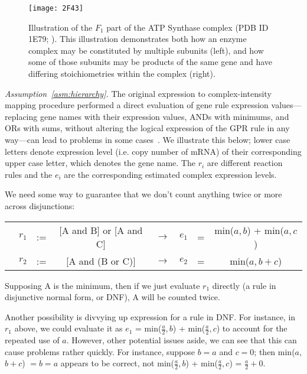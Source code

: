 \begin{figure*}%
\label{fig:2F43}
\centering
\texttt{[image: 2F43]}
\caption{Illustration of the $F_1$ part of the ATP Synthase complex
  (PDB ID 1E79; \citealt{Gibbons2000,Bernstein1978,Gezelter}).
  This illustration demonstrates both how an enzyme complex may be
  constituted by multiple subunits (left), and how some of those
  subunits may be products of the same gene and have differing
  stoichiometries within the complex (right).}
\end{figure*}

\emph{Assumption~\ref{asm:hierarchy}.}
The original expression to complex-intensity mapping procedure
performed a direct evaluation of gene rule expression
values---replacing gene names with their expression values, ANDs with
minimums, and ORs with sums, without altering the logical expression
of the GPR rule in any way---can lead to problems in some
cases~\citep{Lee2012}. We illustrate this below; lower case letters
denote expression level (i.e. copy number of mRNA) of their
corresponding upper case letter, which denotes the gene name. The
$r_i$ are different reaction rules and the $e_i$ are the corresponding
estimated complex expression levels.

We need some way to guarantee that we don’t count anything twice or
more across disjunctions: 
\begin{AlgFloat}[H]
{\setlength{\tabcolsep}{.16667em}
\begin{tabular}{cccccccc}
& $r_1$ & := & [A and B] or [A and C] & $\rightarrow$ & $e_1$  &=& min($a,b$) + min($a,c$) \\ 
& $r_2$ & := & [A and (B or C)]       & $\rightarrow$ & $e_2$  &=&  min($a, b + c$) 
\end{tabular} 
}
\end{AlgFloat}

Supposing A is the minimum, then if we just evaluate $r_1$ directly (a
rule in disjunctive normal form, or DNF), A will be counted twice.

Another possibility is divvying up expression for a rule in DNF. For
instance, in $r_1$ above, we could evaluate it as $e_1$ =
min($\frac{a}{2},b$) + min($\frac{a}{2},c$) to account for the
repeated use of $a$. However, other potential issues aside, we can see
that this can cause problems rather quickly. For instance, suppose $b
= a$ and $c = 0$; then min($a$,$b+c$) $=b=a$ appears to be correct,
not min($\frac{a}{2},b$) + min($\frac{a}{2},c$) = $\frac{a}{2} + 0$.

